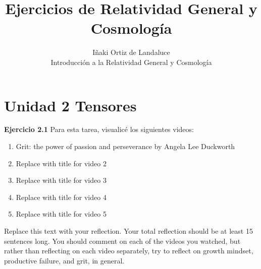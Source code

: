 \documentclass[12pt]{article}
\newenvironment{exercise}[2][Ejercicio]{\begin{trivlist} %
\item[\hskip \labelsep {\bfseries #1}\hskip \labelsep {\bfseries #2.}]}{\end{trivlist}}
\begin{document}
 
 
\title{Ejercicios de Relatividad General y Cosmología}
\author{Iñaki Ortiz de Landaluce\\ %
Introducción a la Relatividad General y Cosmología}

\maketitle

\section*{Unidad 2 Tensores}
 
\noindent \textbf{Ejercicio 2.1} Para esta tarea, visualicé los siguientes videos:

\begin{enumerate}
\item Grit: the power of passion and perseverance by Angela Lee Duckworth  
\item Replace with title for video 2
\item Replace with title for video 3
\item Replace with title for video 4
\item Replace with title for video 5
\end{enumerate}

Replace this text with your reflection. Your total reflection should be at least 15 sentences long. You should comment on each of the videos you watched, but rather than reflecting on each video separately, try to reflect on growth mindset, productive failure, and grit, in general.


 
\end{document}
